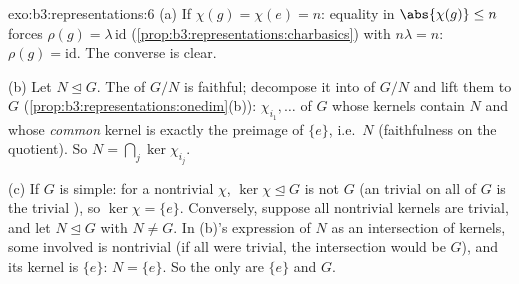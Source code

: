 \begin{solution}{exo:b3:representations:6}
(a) If $\chi(g) = \chi(e) = n$: equality in
$\abs{\chi(g)} \leq n$ forces $\rho(g) = \lambda\,\mathrm{id}$
(\cref{prop:b3:representations:charbasics}) with $n\lambda = n$:
$\rho(g) = \mathrm{id}$. The converse is clear.

(b) Let $N \trianglelefteq G$. The  of
$G/N$ is faithful; decompose it into  of $G/N$ and
lift them to $G$ (\cref{prop:b3:representations:onedim}(b)):
  $\chi_{i_1}, \dots$ of $G$ whose kernels
contain $N$ and whose \emph{common} kernel is exactly the
preimage of $\{e\}$, i.e.\ $N$ (faithfulness on the quotient).
So $N = \bigcap_j \ker\chi_{i_j}$.

(c) If $G$ is simple: for a nontrivial  $\chi$,
$\ker\chi \trianglelefteq G$ is not $G$ (an  trivial on all of $G$ is the trivial ),
so $\ker\chi = \{e\}$. Conversely, suppose all nontrivial
kernels are trivial, and let $N \trianglelefteq G$ with $N \neq
G$. In (b)'s expression of $N$ as an intersection of kernels,
some  involved is nontrivial (if all were trivial, the
intersection would be $G$), and its kernel is $\{e\}$: $N =
\{e\}$. So the only  are $\{e\}$ and $G$.
\end{solution}

